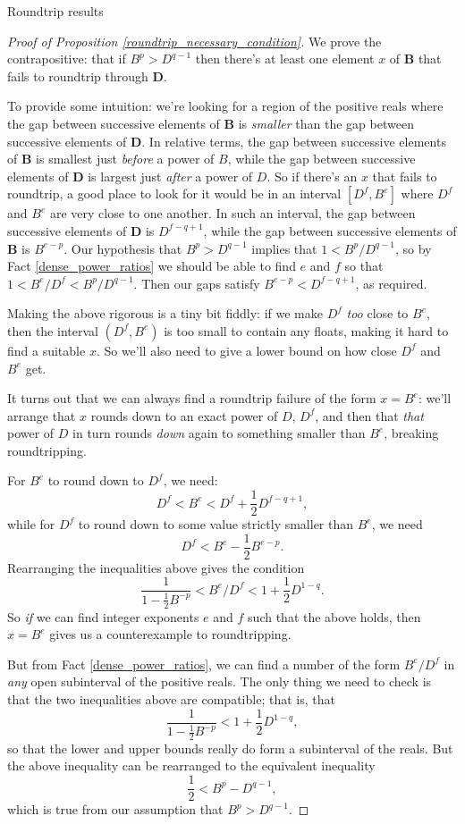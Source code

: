 \documentclass{article}
\theoremstyle{plain}
\theoremstyle{definition}
\begin{document}
\begin{section}{Roundtrip results}
\begin{proof}[Proof of Proposition \ref{roundtrip_necessary_condition}]
  We prove the contrapositive: that if $B^p > D^{q-1}$ then there's at least
  one element $x$ of $\mathbf B$ that fails to roundtrip through $\mathbf D$.

  To provide some intuition: we're looking for a region of the positive reals
  where the gap between successive elements of $\mathbf B$ is \emph{smaller}
  than the gap between successive elements of $\mathbf D$. In relative terms,
  the gap between successive elements of $\mathbf B$ is smallest just
  \emph{before} a power of $B$, while the gap between successive elements of
  $\mathbf D$ is largest just \emph{after} a power of $D$. So if there's an $x$
  that fails to roundtrip, a good place to look for it would be in an interval
  $[D^f, B^e]$ where $D^f$ and $B^e$ are very close to one another. In such an
  interval, the gap between successive elements of $\mathbf D$ is $D^{f-q+1}$,
  while the gap between successive elements of $\mathbf B$ is $B^{e-p}$. Our
  hypothesis that $B^p > D^{q-1}$ implies that $1 < B^p / D^{q-1}$, so by Fact
  \ref{dense_power_ratios} we should be able to find $e$ and $f$ so that $1 <
  B^e / D^f < B^p / D^{q-1}$. Then our gaps satisfy $B^{e-p} < D^{f-q+1}$, as
  required.

  Making the above rigorous is a tiny bit fiddly: if we make $D^f$ \emph{too}
  close to $B^e$, then the interval $(D^f, B^e)$ is too small to contain any
  floats, making it hard to find a suitable $x$. So we'll also need to give a
  lower bound on how close $D^f$ and $B^e$ get.

  It turns out that we can always find a roundtrip failure of the form $x =
  B^e$: we'll arrange that $x$ rounds down to an exact power of $D$, $D^f$, and
  then that \emph{that} power of $D$ in turn rounds \emph{down} again to
  something smaller than $B^e$, breaking roundtripping.

  For $B^e$ to round down to $D^f$, we need:
  $$D^f < B^e < D^f + \frac12 D^{f-q+1},$$ while for $D^f$ to round down to
  some value strictly smaller than $B^e$, we need
  $$D^f < B^e - \frac12 B^{e-p}.$$
  Rearranging the inequalities above gives the condition
  $$\frac{1}{1 - \frac12 B^{-p}} < B^e / D^f < 1 + \frac12 D^{1-q}.$$ So
  \emph{if} we can find integer exponents $e$ and $f$ such that the above
  holds, then $x=B^e$ gives us a counterexample to roundtripping.

  But from Fact \ref{dense_power_ratios}, we can find a number of the form $B^e
  / D^f$ in \emph{any} open subinterval of the positive reals. The only thing
  we need to check is that the two inequalities above are compatible; that is,
  that
  $$\frac{1}{1 - \frac12 B^{-p}} < 1 + \frac12 D^{1-q},$$
  so that the lower and upper bounds really do form a subinterval of the reals.
  But the above inequality can be rearranged to the equivalent inequality
  $$\frac12 < B^{p} - D^{q-1},$$
  which is true from our assumption that $B^p > D^{q-1}$.


\end{proof}
\end{section}
\end{document}
